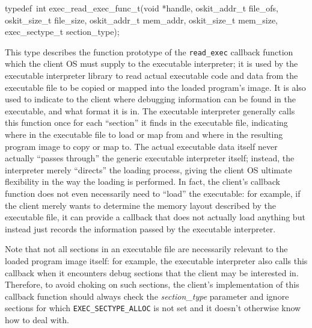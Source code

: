 \label{exec-read-exec}
\begin{apisyn}

	\funcproto typedef~int exec_read_exec_func_t(void *handle,
		oskit_addr_t file_ofs, oskit_size_t file_size,
		oskit_addr_t mem_addr, oskit_size_t mem_size,
		exec_sectype_t section_type);
\end{apisyn}
\begin{apidesc}
	This type describes the function prototype
	of the \texttt{read_exec} callback function
	which the client OS must supply to the executable interpreter;
	it is used by the executable interpreter library
	to read actual executable code and data from the executable file
	to be copied or mapped into the loaded program's image.
	It is also used to indicate to the client
	where debugging information can be found in the executable,
	and what format it is in.
	The executable interpreter generally calls this function
	once for each ``section'' it finds in the executable file,
	indicating where in the executable file to load or map from
	and where in the resulting program image to copy or map to.
	The actual executable data itself
	never actually ``passes through''
	the generic executable interpreter itself;
	instead, the interpreter merely ``directs'' the loading process,
	giving the client OS ultimate flexibility
	in the way the loading is performed.
	In fact, the client's callback function
	does not even necessarily need to ``load'' the executable:
	for example, if the client merely wants
	to determine the memory layout described by the executable file,
	it can provide a callback that does not actually load anything
	but instead just records the information
	passed by the executable interpreter.

	Note that not all sections in an executable file
	are necessarily relevant to the loaded program image itself:
	for example, the executable interpreter also calls this callback
	when it encounters debug sections that the client may be interested in.
	Therefore, to avoid choking on such sections,
	the client's implementation of this callback function
	should always check the \emph{section_type} parameter
	and ignore sections for which \texttt{EXEC_SECTYPE_ALLOC} is not set
	and it doesn't otherwise know how to deal with.
\end{apidesc}
